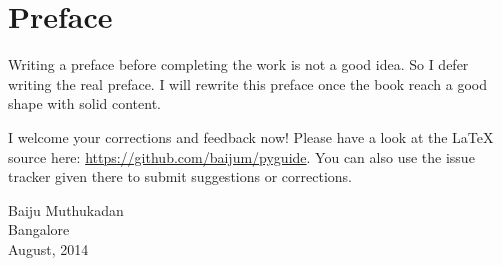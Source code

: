 \cleardoublepage
{}
{}
\chapter*{Preface}

Writing a preface before completing the work is not a good idea.  So I
defer writing the real preface.  I will rewrite this preface once the
book reach a good shape with solid content.

I welcome your corrections and feedback now!  Please have a look at
the LaTeX source here: \url{https://github.com/baijum/pyguide}.  You
can also use the issue tracker given there to submit suggestions or
corrections.

\vspace*{.5in}
Baiju Muthukadan\\
Bangalore\\August, 2014
